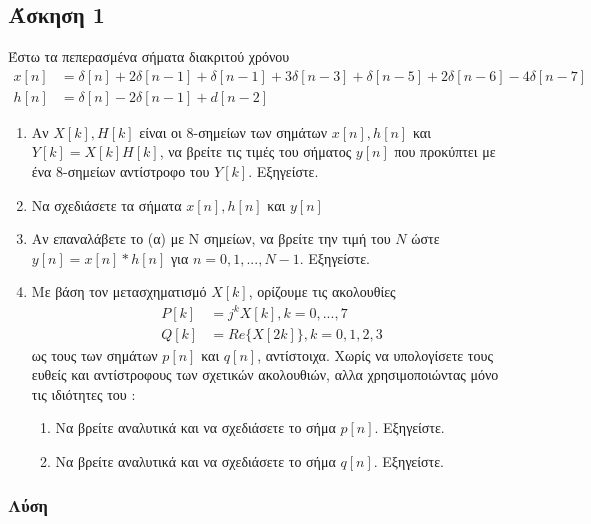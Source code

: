 \newpage\subsection*{Άσκηση 1}

Έστω τα πεπερασμένα σήματα διακριτού χρόνου 
\begin{align*}
x[n] &= \delta[n] + 2\delta[n-1] + \delta[n-1] + 3\delta[n-3] + \delta[n-5] + 2\delta[n-6] - 4\delta[n-7] \\
h[n] &= \delta[n] - 2\delta[n-1] + d[n-2]
\end{align*}

\begin{enumerate}[label=\textbf{(\alph*)}]
    \item Αν $X[k], H[k]$ είναι οι 8-σημείων  των σημάτων $x[n],h[n]$ και $Y[k] = X[k]H[k]$, να βρείτε τις
        τιμές του σήματος $y[n]$ που προκύπτει με ένα 8-σημείων αντίστροφο  του $Y[k]$.
        Εξηγείστε.

    \item Να σχεδιάσετε τα σήματα $x[n],h[n]$ και $y[n]$
    \item Αν επαναλάβετε το (α) με  Ν σημείων, να βρείτε την τιμή του $N$ ώστε $y[n] = x[n] \ast h[n]$ 
        για $n = 0, 1, ..., N -1$. Εξηγείστε.
    \item Με βάση τον μετασχηματισμό $X[k]$, ορίζουμε τις ακολουθίες
        \begin {align*}
        P[k] &= j^kX[k], k = 0, ..., 7 \\
        Q[k] &= Re\{X[2k]\}, k = 0, 1, 2, 3
        \end {align*}
        ως τους  των σημάτων $p[n]$ και $q[n]$, αντίστοιχα. Χωρίς να υπολογίσετε τους ευθείς και αντίστροφους 
         των σχετικών ακολουθιών, αλλα χρησιμοποιώντας μόνο τις ιδιότητες του :
        \begin{enumerate}[label=\textbf{(δ.\arabic*)}]
            \item Να βρείτε αναλυτικά και να σχεδιάσετε το σήμα $p[n]$. Εξηγείστε.
            \item Να βρείτε αναλυτικά και να σχεδιάσετε το σήμα $q[n]$. Εξηγείστε.
        \end{enumerate}
\end{enumerate}

\subsubsection*{Λύση}

